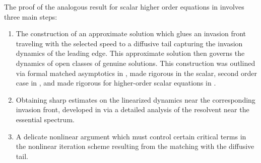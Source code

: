 \documentclass[11pt]{article}
\newcommand{\R}{\mathbb{R}}
\numberwithin{equation}{section}
\numberwithin{prop}{section}
\begin{document}

The proof of the analogous result for scalar higher order equations in \cite{CAMS} involves three main steps:
\begin{enumerate}
	\item The construction of an approximate solution which glues an invasion front traveling with the selected speed to a diffusive tail capturing the invasion dynamics of the leading edge. This approximate solution then governs the dynamics of open classes of genuine solutions. This construction was outlined via formal matched asymptotics in \cite{EbertvanSaarloos}, made rigorous in the scalar, second order case in \cite{NRRrefined}, and made rigorous for higher-order scalar equations in \cite{CAMS}. 
	\item Obtaining sharp estimates on the linearized dynamics near the corresponding invasion front, developed in \cite{SIMA} via a detailed analysis of the resolvent near the essential spectrum. 
	\item A delicate nonlinear argument which must control certain critical terms in the nonlinear iteration scheme resulting from the matching with the diffusive tail. 
\end{enumerate}
\end{document}
